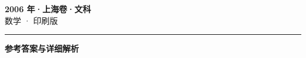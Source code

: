 \documentclass[zihao=5, a4paper]{ctexart}
\begin{document}
\begin{center}
  {\Large\bfseries 2006 年·上海卷·文科}\\[4pt]
  {\large 数学 · 印刷版}
\end{center}
\medskip
{}

\par\bigskip\hrule\bigskip
{}
\begin{center}{\large\bfseries 参考答案与详细解析}\end{center}
\smallskip

\end{document}

